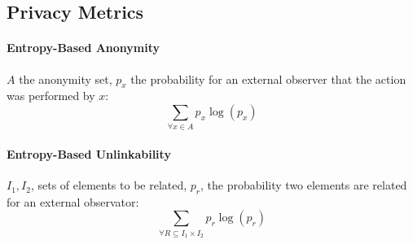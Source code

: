 \documentclass[10pt, a4paper,twocolumn]{scrartcl}
\begin{document}
\subsection{Privacy Metrics}

\paragraph{Entropy-Based Anonymity}
$A$ the anonymity set, $p_x$ the probability for an external observer that the action was performed by $x$:
\begin{equation*}
	\sum_{\forall x \in A} p_x \log(p_x)
\end{equation*}

\paragraph{Entropy-Based Unlinkability}
$I_1,I_2$, sets of elements to be related, $p_r$, the probability two elements are related for an external observator:
\begin{equation*}
	\sum_{\forall R \subseteq I_1 \times I_2}p_r \log(p_r)
\end{equation*}
\end{document}
